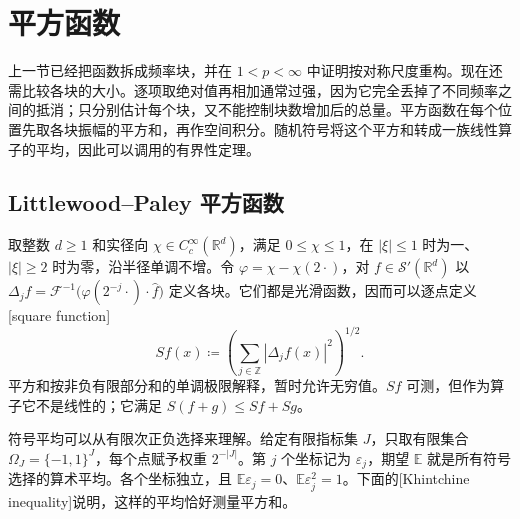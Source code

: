 \section{平方函数}
\label{b2:sec:1904}

上一节已经把函数拆成频率块，并在 \(1<p<\infty\) 中证明按对称尺度重构。现在还需比较各块的大小。逐项取绝对值再相加通常过强，因为它完全丢掉了不同频率之间的抵消；只分别估计每个块，又不能控制块数增加后的总量。平方函数在每个位置先取各块振幅的平方和，再作空间积分。随机符号将这个平方和转成一族线性算子的平均，因此可以调用的有界性定理。

\subsection{Littlewood--Paley 平方函数}
\label{b2:subsec:190401}

取整数 \(d\geq1\) 和实径向 \(\chi\in C_c^\infty(\mathbb R^d)\)，满足 \(0\leq\chi\leq1\)，在 \(|\xi|\leq1\) 时为一、\(|\xi|\geq2\) 时为零，沿半径单调不增。令 \(\varphi=\chi-\chi(2\cdot)\)，对 \(f\in\mathcal S'(\mathbb R^d)\) 以
\(\Delta_jf=\mathcal F^{-1}\bigl(\varphi(2^{-j}\cdot)\cdot\widehat f\bigr)\)
定义各块。它们都是光滑函数，因而可以逐点定义[square function]
\[
 Sf(x)\coloneqq
 \left(\sum_{j\in\mathbb Z}|\Delta_jf(x)|^2\right)^{1/2}.
\]
平方和按非负有限部分和的单调极限解释，暂时允许无穷值。\(Sf\) 可测，但作为算子它不是线性的；它满足 \(S(f+g)\leq Sf+Sg\)。

\ProseParagraphBreak

符号平均可以从有限次正负选择来理解。给定有限指标集 \(J\)，只取有限集合 \(\Omega_J=\{-1,1\}^J\)，每个点赋予权重 \(2^{-|J|}\)。第 \(j\) 个坐标记为 \(\varepsilon_j\)，期望 \(\mathbb E\) 就是所有符号选择的算术平均。各个坐标独立，且 \(\mathbb E\varepsilon_j=0\)、\(\mathbb E\varepsilon_j^2=1\)。下面的[Khintchine inequality]说明，这样的平均恰好测量平方和。

